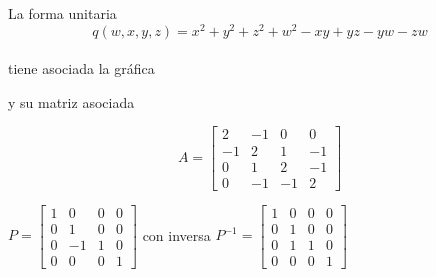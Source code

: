 \begin{example}\citep{AbarcaSoteloMarioAlberto2011Apds}
La forma unitaria
\begin{equation}
    q(w, x, y, z) = x^{2} + y^{2} + z^{2} + w^{2} - xy + yz - yw - zw
    \label{ecuacion:1.5}
\end{equation}\\

tiene asociada la gráfica\\

\begin{center}
\end{center}

y su matriz asociada\\

\begin{center}
\begin{equation*}
    A = \begin{bmatrix}
    2 & -1  &  0 &  0\\
   -1 &  2  &  1 & -1\\
    0 &  1  &  2 & -1 \\
    0 & -1  & -1 &  2
    \end{bmatrix}
\end{equation*}
\end{center}

$P = \begin{bmatrix}
   1 &  0  & 0 & 0\\
   0 &  1  & 0 & 0\\
   0 & -1  & 1 & 0 \\
   0 &  0  & 0 & 1
      \end{bmatrix}$ con inversa  $P^{-1} =  \begin{bmatrix}
   1 &  0  & 0 & 0\\
   0 &  1  & 0 & 0\\
   0 &  1  & 1 & 0 \\
   0 &  0  & 0 & 1
           \end{bmatrix}$
           

\end{example}
